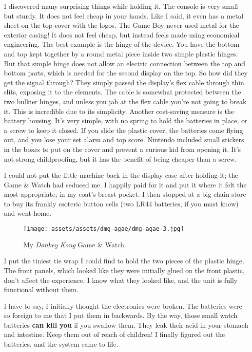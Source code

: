 \documentclass{book}
\begin{document}
I discovered many surprising things while holding it. The console is very small but sturdy. It does not feel cheap in your hands. Like I said, it even has a metal sheet on the top cover with the logos. The Game Boy never used metal for the exterior casing! It does not feel cheap, but instead feels made using economical engineering. The best example is the hinge of the device. You have the bottom and top kept together by a round metal piece inside two simple plastic hinges. But that simple hinge does not allow an electric connection between the top and bottom parts, which is needed for the second display on the top. So how did they get the signal through? They simply passed the display’s flex cable through thin slits, exposing it to the elements. The cable is somewhat protected between the two bulkier hinges, and unless you jab at the flex cable you’re not going to break it. This is incredible due to its simplicity. Another cost-saving measure is the battery housing. It’s very simple, with no spring to hold the batteries in place, or a screw to keep it closed. If you slide the plastic cover, the batteries come flying out, and you lose your set alarm and top score. Nintendo included small stickers in the boxes to put on the cover and prevent a curious kid from opening it. It’s not strong childproofing, but it has the benefit of being cheaper than a screw.

I could not put the little machine back in the display case after holding it; the Game \& Watch had seduced me. I happily paid for it and put it where it felt the most appropriate; in my coat’s breast pocket. I then stopped at a big chain store to buy its frankly esoteric button cells (two LR44 batteries, if you must know) and went home.

\begin{figure}[hbt]
\vskip 10pt
\centering \texttt{[image: assets/assets/dmg-agae/dmg-agae-3.jpg]}\par\pagetwodescription My \emph{Donkey Kong} Game \& Watch.
\vskip 6pt
\end{figure}

I put the tiniest tie wrap I could find to hold the two pieces of the plastic hinge. The front panels, which looked like they were initially glued on the front plastic, don’t affect the experience. I know what they looked like, and the unit is fully functional without them.

I have to say, I initially thought the electronics were broken. The batteries were so foreign to me that I put them in backwards. By the way, those small watch batteries \textbf{can kill you} if you swallow them. They leak their acid in your stomach and intestine. Keep them out of reach of children! I finally figured out the batteries, and the system came to life.
\end{document}
